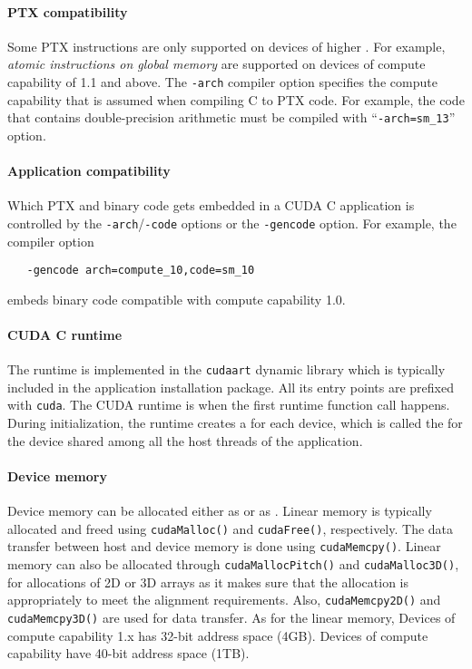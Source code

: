 \documentclass{myart}
\begin{document}
\paragraph{PTX compatibility}
\bit
\w Some PTX instructions are only supported on devices of higher . For example, {\em atomic instructions on global memory\/} are
supported on devices of compute capability of 1.1 and above. 
\w The \verb+-arch+ compiler option specifies the compute
capability that is assumed when compiling C to PTX code.  For example, the
code that contains double-precision arithmetic must be compiled with
``\verb+-arch=sm_13+'' option.
\eit

\paragraph{Application compatibility}
\bit
\w Which PTX and binary code gets embedded in a CUDA C application is
controlled by the \verb+-arch+/\verb+-code+ options or the \verb+-gencode+
option. 
\w For example, the compiler option
  \begin{verbatim}
   -gencode arch=compute_10,code=sm_10
  \end{verbatim}
embeds binary code compatible with compute capability 1.0.
\eit

\paragraph{CUDA C runtime}
\bit
\w The runtime is implemented in the \verb+cudaart+ dynamic library which is
typically included in the application installation package. All its entry
points are prefixed with \verb+cuda+.
\w The CUDA runtime is  when the first runtime function call
happens. During initialization, the runtime creates a  for
each device, which is called the  for the device shared
among all the host threads of the application. 
\eit

\paragraph{Device memory}
\bit
\w Device memory can be allocated either as  or as . 
\w Linear memory is typically allocated and freed using \verb+cudaMalloc()+ and
\verb+cudaFree()+, respectively. The data transfer between host and device
memory is done using \verb+cudaMemcpy()+.  
  \bit
  \w Linear memory can also be allocated through \verb+cudaMallocPitch()+ and
  \verb+cudaMalloc3D()+, for allocations of 2D or 3D arrays as it makes sure
  that the allocation is appropriately  to meet the alignment
  requirements. Also, \verb+cudaMemcpy2D()+ and \verb+cudaMemcpy3D()+ are
  used for data transfer.
  \eit
\w As for the linear memory, Devices of compute capability 1.x has 32-bit
address space (4GB). Devices of compute capability have 40-bit address space (1TB). 
\eit
\end{document}
